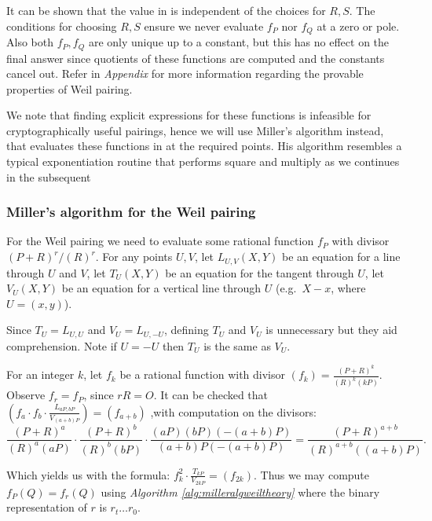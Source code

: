 It can be shown that the value in  is independent of the choices for $R, S$. The conditions for choosing $R, S$ ensure we never evaluate $f_P$ nor $f_Q$ at a zero or pole. Also both $f_P, f_Q$ are only unique up to a constant, but this has no effect on the final answer since quotients of these functions are computed and the constants cancel out. Refer  in \textit{Appendix } for more information regarding the provable properties of Weil pairing. 

We note that finding explicit expressions for these functions is infeasible for cryptographically useful pairings, hence we will use Miller's algorithm \cite{Miller1986, Miller04} instead, that evaluates these functions in at the required points. His algorithm resembles a typical exponentiation routine that performs square and multiply as we continues in the subsequent 

\subsubsection{Miller's algorithm for the Weil pairing}
\label{sssec:ch3.millersalgorithmforweilpairing}

For the Weil pairing we need to evaluate some rational function $f_P$ with divisor $(P+R)^r/(R)^r$.  For any points $U, V$, let $L_{U,V}(X, Y)$ be an equation for a line through $U$ and $V$, let $T_U(X, Y)$ be an equation for the tangent through $U$, let $V_U(X, Y)$ be an equation for a vertical line through $U$ (e.g.\ $X - x$, where $U = (x, y)$).

Since $T_U = L_{U,U}$ and $V_U = L_{U,-U}$, defining $T_U$ and $V_U$ is unnecessary but they aid comprehension. Note if $U = -U$ then $T_U$ is the same as $V_U$.

For an integer $k$, let $f_k$ be a rational function with divisor
$(f_k) = \frac{(P+R)^k}{(R)^k(kP)}.$ Observe $f_r = f_P$, since $rR = O$. It can be checked that $
\left( f_a \cdot f_b \cdot \frac{L_{aP,bP}}{V_{(a+b)P}}\right) = (f_{a+b})
$ ,with computation on the divisors: 
$$\frac{(P+R)^a}{(R)^a(aP)} \cdot \frac{(P+R)^b}{(R)^b(bP)} \cdot \frac{(aP)(bP)(-(a+b)P)}{(a+b)P(-(a+b)P)} = \frac{(P+R)^{a+b}}{(R)^{a+b}((a+b)P)}.$$

Which yields us with the formula:  $f_k^2 \cdot \frac{T_{kP}}{V_{2kP}} = (f_{2k})$.  Thus we may compute $f_P(Q) = f_r(Q)$ using \textit{Algorithm \ref{alg:milleralgweiltheory}} where the binary representation of $r$ is $r_t \ldots r_0$.

